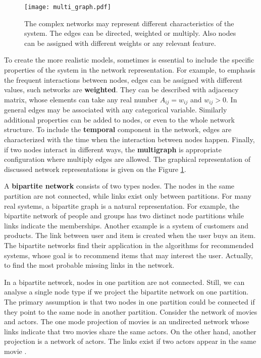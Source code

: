\begin{figure}[h]
	\centering
	\texttt{[image: multi\_graph.pdf]} 
	\caption[Different network representations.]{The complex networks may represent different characteristics of the system. The edges can be directed, weighted or multiply. Also nodes can be assigned with different weights or any relevant feature.}
	\label{fig:multigraph}
\end{figure}

To create the more realistic models, sometimes is essential to include the specific properties of the system in the network representation. For example, to emphasis the frequent interactions between nodes, edges can be assigned with different values, such networks are \textbf{weighted}. They can be described with adjacency matrix, whose elements can take any real number $A_{ij}=w_{ij}$ and $w_{ij}>0$. In general edges may be associated with any categorical variable. Similarly additional properties can be added to nodes, or even to the whole network structure. To include the \textbf{temporal} component in the network, edges are characterized with the time when the interaction between nodes happen. Finally, if two nodes interact in different ways, the \textbf{multigraph} is appropriate configuration where multiply edges are allowed. The graphical representation of discussed network representations is given on the Figure \ref{fig:multigraph}.

A \textbf{bipartite network} consists of two types nodes. The nodes in the same partition are not connected, while links exist only between partitions. For many real systems, a bipartite graph is a natural representation\cite{barabasi2016network, latora2017complex}. For example, the bipartite network of people and groups has two distinct node partitions while links indicate the memberships. Another example is a system of customers and products. The link between user and item is created when the user buys an item. The bipartite networks find their application in the algorithms for recommended systems, whose goal is to recommend items that may interest the user. Actually, to find the most probable missing links in the network. 

In a bipartite network, nodes in one partition are not connected. Still, we can analyse a single node type if we project the bipartite network on one partition. The primary assumption is that two nodes in one partition could be connected if they point to the same node in another partition. Consider the network of movies and actors. The one mode projection of movies is an undirected network whose links indicate that two movies share the same actors. On the other hand, another projection is a network of actors. The links exist if two actors appear in the same movie \cite{newman2010, barabasi2016network}.

